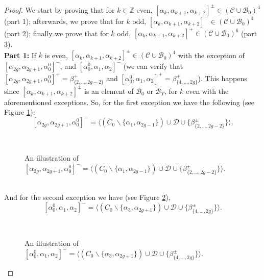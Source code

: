 \documentclass[twoside,11pt,a4paper]{article}
\newcommand*{\Cf}{\mathscr{C}}
\newcommand*{\Bf}{\mathscr{B}}
\newcommand*{\Df}{\mathscr{D}}
\begin{document}
\begin{proof} 
 We start by proving that for $k \in \mathbb{Z}$ even, $[\alpha_{k}, \alpha_{k+1}, \alpha_{k+2}]^{\pm} \in (\Cf \cup \Bf_{0})^{4}$ (part 1); afterwards, we prove that for $k$ odd, $[\alpha_{k}, \alpha_{k+1}, \alpha_{k+2}]^{-} \in (\Cf \cup \Bf_{0})^{4}$ (part 2); finally we prove that for $k$ odd, $[\alpha_{k}, \alpha_{k+1}, \alpha_{k+2}]^{+} \in (\Cf \cup \Bf_{0})^{6}$ (part 3).\\
\textbf{Part 1:} If $k$ is even, $[\alpha_{k}, \alpha_{k+1}, \alpha_{k+2}]^{\pm} \in (\Cf \cup \Bf_{0})^{4}$ with the exception of $[\alpha_{2g}, \alpha_{2g+1}, \alpha_{0}^{0}]^{-}$, and $[\alpha_{0}^{0},\alpha_{1},\alpha_{2}]^{-}$ (we can verify that $[\alpha_{2g}, \alpha_{2g+1}, \alpha_{0}^{0}]^{+} = \beta_{\{2, \ldots, 2g-2\}}^{+}$ and $[\alpha_{0}^{0},\alpha_{1},\alpha_{2}]^{+} = \beta_{\{4, \ldots, 2g\}}^{+}$). This happens since $[\alpha_{k}, \alpha_{k+1}, \alpha_{k+2}]^{\pm}$ is an element of $\Bf_{0}$ or $\Bf_{T}$, for $k$ even with the aforementioned exceptions. So, for the first exception we have the following (see Figure \ref{Translemaprop1fig1}):$$[\alpha_{2g}, \alpha_{2g+1}, \alpha_{0}^{0}]^{-} = \langle (C_{0} \backslash \{\alpha_{1}, \alpha_{2g-1}\}) \cup \Df \cup \{\beta_{\{2, \ldots, 2g-2\}}^{\pm}\}\rangle.$$
\begin{figure}[h]
 \begin{center}
  \resizebox{9cm}{!}{} \\[0.2cm]
  \resizebox{9cm}{!}{} \caption{An illustration of $[\alpha_{2g}, \alpha_{2g+1}, \alpha_{0}^{0}]^{-} = \langle (C_{0} \backslash \{\alpha_{1}, \alpha_{2g-1}\}) \cup \Df \cup \{\beta_{\{2, \ldots, 2g-2\}}^{\pm}\}\rangle$.} \label{Translemaprop1fig1}
 \end{center}
\end{figure}\\
And for the second exception we have (see Figure \ref{Translemaprop1fig3}), $$[\alpha_{0}^{0},\alpha_{1},\alpha_{2}]^{-} = \langle (C_{0} \backslash \{\alpha_{3},\alpha_{2g+1}\}) \cup \Df \cup \{\beta_{\{4,\ldots, 2g\}}^{\pm}\}\rangle.$$
\begin{figure}[h]
 \begin{center}
  \resizebox{9cm}{!}{} \\[0.2cm]
  \resizebox{9cm}{!}{} \caption{An illustration of $[\alpha_{0}^{0},\alpha_{1},\alpha_{2}]^{-} = \langle (C_{0} \backslash \{\alpha_{3},\alpha_{2g+1}\}) \cup \Df \cup \{\beta_{\{4,\ldots, 2g\}}^{\pm}\}\rangle$.} \label{Translemaprop1fig3}

\end{center}
\end{figure}
\end{proof}
\end{document}
